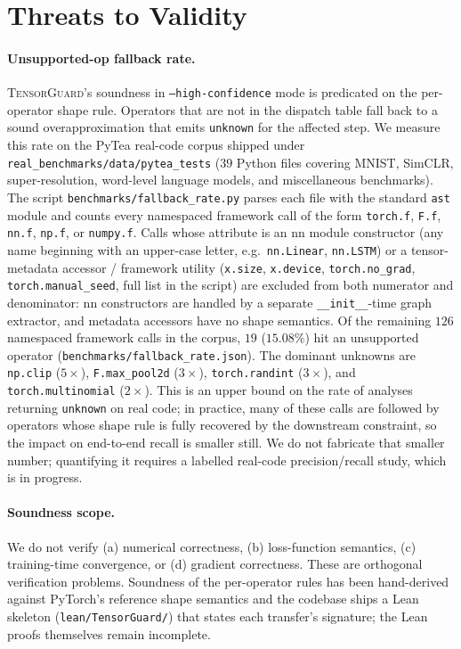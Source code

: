 \documentclass{article}
\theoremstyle{plain}
\theoremstyle{definition}
\newcommand{\TensorGuard}{\textsc{TensorGuard}}
\newcommand{\code}[1]{\texttt{\small #1}}
\begin{document}
\section{Threats to Validity}\label{sec:threats}

\paragraph{Unsupported-op fallback rate.}
\TensorGuard{}'s soundness in \code{--high-confidence} mode is
predicated on the per-operator shape rule.  Operators that are not
in the dispatch table fall back to a sound overapproximation that
emits \code{unknown} for the affected step.  We measure this rate
on the PyTea \citep{pytea2022} real-code corpus shipped under
\code{real\_benchmarks/data/pytea\_tests} ($39$ Python files
covering MNIST, SimCLR, super-resolution, word-level language
models, and miscellaneous benchmarks).  The script
\code{benchmarks/fallback\_rate.py} parses each file with the
standard \code{ast} module and counts every namespaced framework
call of the form \code{torch.f}, \code{F.f}, \code{nn.f},
\code{np.f}, or \code{numpy.f}.  Calls whose attribute is an nn
module constructor (any name beginning with an upper-case letter,
e.g.\ \code{nn.Linear}, \code{nn.LSTM}) or a tensor-metadata
accessor / framework utility (\code{x.size}, \code{x.device},
\code{torch.no\_grad}, \code{torch.manual\_seed}, full list in the
script) are excluded from both numerator and denominator: nn
constructors are handled by a separate \code{\_\_init\_\_}-time
graph extractor, and metadata accessors have no shape semantics.
Of the remaining $126$ namespaced framework calls in the corpus,
$19$ ($15.08\%$) hit an unsupported operator
(\code{benchmarks/fallback\_rate.json}).  The dominant unknowns
are \code{np.clip} ($5\times$), \code{F.max\_pool2d} ($3\times$),
\code{torch.randint} ($3\times$), and \code{torch.multinomial}
($2\times$).  This is an upper bound on the rate of analyses
returning \code{unknown} on real code; in practice, many of these
calls are followed by operators whose shape rule is fully recovered
by the downstream constraint, so the impact on end-to-end recall
is smaller still.  We do not fabricate that smaller number;
quantifying it requires a labelled real-code precision/recall
study, which is in progress.

\paragraph{Soundness scope.}
We do not verify (a) numerical correctness, (b) loss-function
semantics, (c) training-time convergence, or (d) gradient
correctness.  These are orthogonal verification problems.  Soundness
of the per-operator rules has been hand-derived against PyTorch's
reference shape semantics and the codebase ships a Lean skeleton
(\code{lean/TensorGuard/}) that states each transfer's signature;
the Lean proofs themselves remain incomplete.
\end{document}
